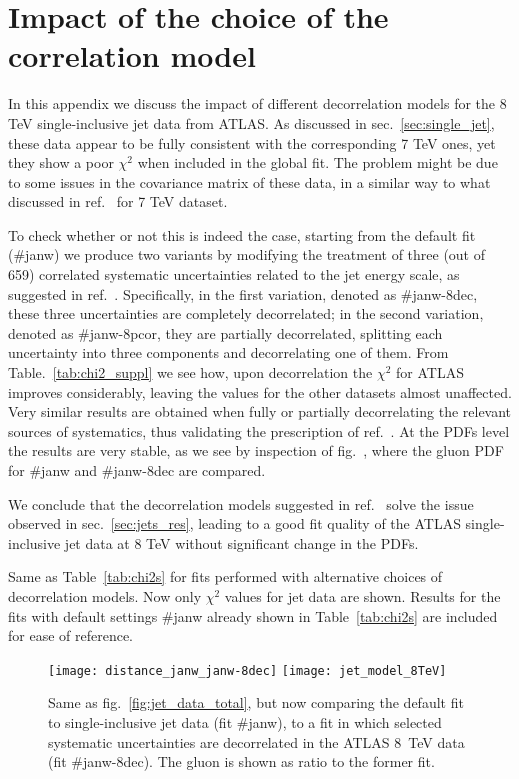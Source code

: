 
\chapter{Impact of the choice of the correlation model}
\label{app:jets}
In this appendix we discuss the impact of different decorrelation models for the 8 TeV single-inclusive jet data
from ATLAS.
As discussed in sec.~\ref{sec:single_jet}, these data appear to be fully consistent with the corresponding
7 TeV ones, yet they show a poor $\chi^2$ when included in the global fit.
The problem might be due to some issues in the covariance matrix of these data, in a similar way 
to what discussed in ref.~\cite{Harland-Lang:2017ytb} for 7 TeV dataset.

%
To check whether or not this is indeed the case, starting from the default fit (\#janw) we produce two variants 
by modifying the treatment of three (out of 659) correlated systematic uncertainties
related to the jet energy scale, as suggested in ref.~\cite{Aaboud:2017dvo}.
Specifically, in the first variation, denoted as \#janw-8dec, these three uncertainties are completely decorrelated;
in the second variation, denoted as \#janw-8pcor, they are partially decorrelated, splitting each uncertainty 
into three components and decorrelating one of them.
From Table.~\ref{tab:chi2_suppl} we see how, upon decorrelation the $\chi^2$ for ATLAS improves considerably, leaving the 
values for the other datasets almost unaffected. Very similar results are obtained when fully or partially 
decorrelating the relevant sources of systematics, thus validating the prescription of ref.~\cite{Aaboud:2017dvo}.
At the PDFs level the results are very stable, as we see by inspection of fig.~, where the gluon PDF for 
\#janw and \#janw-8dec are compared.

%
We conclude that the decorrelation models suggested in ref.~\cite{Aaboud:2017dvo} solve the issue observed in
sec.~\ref{sec:jets_res}, leading to a good fit quality of the ATLAS single-inclusive jet data at 8 TeV without
significant change in the PDFs.

\begin{table}[!t]
    \renewcommand*{\arraystretch}{1.60}
    \scriptsize
    \centering
    
    \vspace{0.3cm}
    \caption{Same as Table~\ref{tab:chi2s} for
      fits performed with alternative choices of decorrelation models.
      Now only $\chi^2$ values for jet data are shown. Results for the fits with default settings
      \#janw already shown  in Table~\ref{tab:chi2s} are included for ease of reference.}
    \label{tab:chi2_suppl}
\end{table}

\begin{figure}[!t]
    \centering
    \texttt{[image: distance\_janw\_janw-8dec]}
    \texttt{[image: jet\_model\_8TeV]}\\
    \caption{Same as fig.~\ref{fig:jet_data_total}, but now comparing
      the default fit to single-inclusive jet data (fit \#janw), to a fit in which selected systematic uncertainties
      are decorrelated in the ATLAS 8~TeV data (fit \#janw-8dec). The gluon is  shown as ratio to the former fit.}
    \label{fig:jet_data_model_8TeV} 
\end{figure}